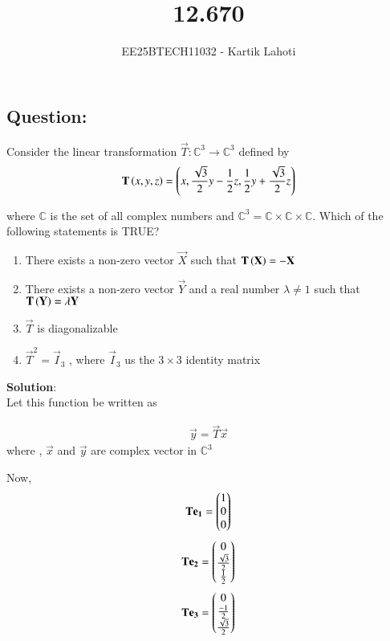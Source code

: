 \documentclass[journal]{IEEEtran}
\numberwithin{equation}{enumi}
\numberwithin{figure}{enumi}
\begin{document}

\vspace{3cm}

\title{12.670}
\author{EE25BTECH11032 - Kartik Lahoti}
\maketitle

\subsection*{Question: } 
Consider the linear transformation $\vec{T} \colon \mathbb{C}^3 \xrightarrow{} \mathbb{C}^3$ defined by 
\begin{align*}
    \mathbf{T}\left(x,y,z\right) = \left(x,\frac{\sqrt{3}}{2}y - \frac{1}{2}z , \frac{1}{2}y+\frac{\sqrt{3}}{2}z\right)
\end{align*}

where $\mathbb{C}$ is the set of all complex numbers and $\mathbb{C}^3 = \mathbb{C}\times\mathbb{C}\times\mathbb{C} $. Which of the following statements is TRUE?

\begin{enumerate}
        \item There exists a non-zero vector $\vec{X}$ such that $\mathbf{T}\left(\mathbf{X}\right) = -\mathbf{X}$
        \item There exists a non-zero vector $\vec{Y}$ and a real number  $\lambda \neq 1$  such that $\mathbf{T}\left(\mathbf{Y}\right) = \lambda\mathbf{Y}$
        \item $\vec{T}$ is diagonalizable
        \item $\vec{T}^2 = \vec{I}_3$ , where $\vec{I}_3$ us the $3\times 3$ identity matrix
    \end{enumerate}
\textbf{Solution}:\\

Let this function be written as 

\begin{align}
    \vec{y} = \vec{T}\vec{x}
\end{align}
where , $\vec{x} $ and $\vec{y}$ are complex vector in $\mathbb{C}^3$

Now, 
\begin{align}
    \mathbf{T}\mathbf{e_1} = \begin{pmatrix}1\\ 0 \\ 0\end{pmatrix} 
\end{align}
\begin{align}
    \mathbf{T}\mathbf{e_2}  = \begin{pmatrix}0\\ \frac{\sqrt{3}}{2} \\ \frac{1}{2}\end{pmatrix} 
\end{align}
\begin{align}
    \mathbf{T}\mathbf{e_3}  = \begin{pmatrix}0\\ \frac{-1}{2} \\ \frac{\sqrt{3}}{2}\end{pmatrix} 
\end{align}
\end{document}
